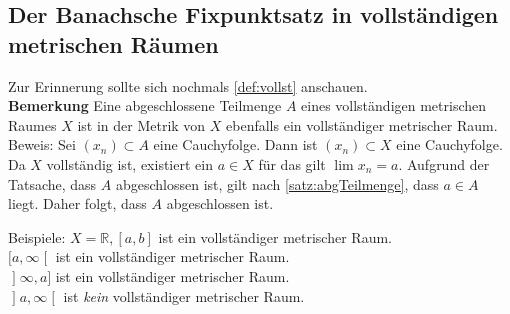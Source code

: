 \documentclass[ngerman,titlepage,twoside, parskip=half*]{scrreprt}
\newcommand*{\R}{\mathbb{R}}
\theoremstyle{plain}
\theoremstyle{definition}
\theoremstyle{remark}
\newcommand*{\lsofint}[1]{\mathopen{]}#1]}   %
\newcommand*{\rsofint}[1]{[#1\mathclose{[}}  %
\newcommand*{\bsofint}[1]{\mathopen{]}#1\mathclose{[}} %
\begin{document}
\subsection{Der Banachsche Fixpunktsatz in vollständigen metrischen Räumen}

Zur Erinnerung sollte sich nochmals \autoref{def:vollst} anschauen.\\
\textbf{Bemerkung} Eine abgeschlossene Teilmenge $A$ eines vollständigen metrischen Raumes $X$ ist in der Metrik
von $X$ ebenfalls ein vollständiger metrischer Raum.\\
Beweis: Sei $(x_n)\subset A$ eine Cauchyfolge. Dann ist $(x_n)\subset X$ eine Cauchyfolge. Da $X$ vollständig ist,
existiert ein $a\in X$ für das gilt $\lim x_n=a$. Aufgrund der Tatsache, dass $A$ abgeschlossen ist, gilt nach
\autoref{satz:abgTeilmenge}, dass $a\in A$ liegt. Daher folgt, dass $A$ abgeschlossen ist.

Beispiele: $X=\R, [a,b]$ ist ein vollständiger metrischer Raum.\\
$\rsofint{a,\infty}$ ist ein vollständiger metrischer Raum.\\
$\lsofint{\infty,a}$ ist ein vollständiger metrischer Raum.\\
$\bsofint{a,\infty}$ ist \emph{kein} vollständiger metrischer Raum.
\end{document}
